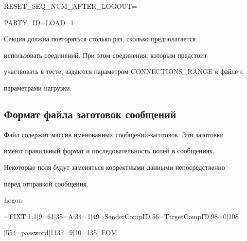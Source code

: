   \noindent


{\sf   RESET\_SEQ\_NUM\_AFTER\_LOGOUT\;=}





  \noindent


{\sf   PARTY\_ID\;=\;LOAD\_1}





  Секция {\sf [FIX]} должна повторяться столько раз, сколько предполагается


использовать соединений. При этом соединения, которым предстоит


участвовать в тесте, задаются параметром {\sf CONNECTIONS\_RANGE} в файле с


параметрами нагрузки.





\vspace*{-6pt}





  \subsection{Формат файла заготовок сообщений}





  Файл содержит массив именованных сообщений-заготовок. Эти заготовки


имеют правильный формат и последовательность полей в сообщениях.


Некоторые поля будут заменяться корректными данными непосредственно


перед отправкой сообщения.





{\sf   Logon}





  \noindent


{=FIXT.1.1$\vert$9=61$\vert$35=A$\vert$34=1$\vert$49=SenderCompID$\vert$56=TargetCompID$\vert$98=0$\vert$108}





\noindent


{$\vert$554=password$\vert$1137=9$\vert$10=135$\vert$ EOM}








